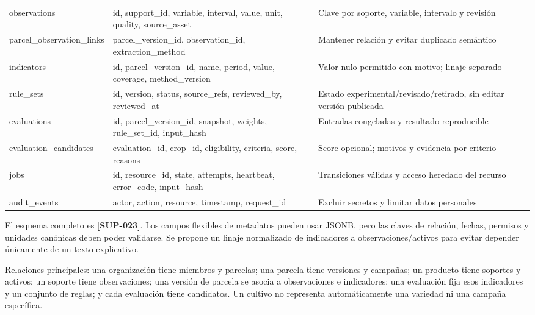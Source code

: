 \documentclass[10pt,a4paper]{article}
\begin{document}
\begin{longtable}{>{\raggedright\arraybackslash}p{3.647cm}>{\raggedright\arraybackslash}p{5.867cm}>{\raggedright\arraybackslash}p{6.343cm}}
observations & id, support\_\allowbreak{}id, variable, interval, value, unit, quality, source\_\allowbreak{}asset & Clave por soporte, variable, intervalo y revisión \\[3pt]
parcel\_\allowbreak{}observation\_\allowbreak{}links & parcel\_\allowbreak{}version\_\allowbreak{}id, observation\_\allowbreak{}id, extraction\_\allowbreak{}method & Mantener relación y evitar duplicado semántico \\[3pt]
indicators & id, parcel\_\allowbreak{}version\_\allowbreak{}id, name, period, value, coverage, method\_\allowbreak{}version & Valor nulo permitido con motivo; linaje separado \\[3pt]
rule\_\allowbreak{}sets & id, version, status, source\_\allowbreak{}refs, reviewed\_\allowbreak{}by, reviewed\_\allowbreak{}at & Estado experimental/\allowbreak{}revisado/\allowbreak{}retirado, sin editar versión publicada \\[3pt]
evaluations & id, parcel\_\allowbreak{}version\_\allowbreak{}id, snapshot, weights, rule\_\allowbreak{}set\_\allowbreak{}id, input\_\allowbreak{}hash & Entradas congeladas y resultado reproducible \\[3pt]
evaluation\_\allowbreak{}candidates & evaluation\_\allowbreak{}id, crop\_\allowbreak{}id, eligibility, criteria, score, reasons & Score opcional; motivos y evidencia por criterio \\[3pt]
jobs & id, resource\_\allowbreak{}id, state, attempts, heartbeat, error\_\allowbreak{}code, input\_\allowbreak{}hash & Transiciones válidas y acceso heredado del recurso \\[3pt]
audit\_\allowbreak{}events & actor, action, resource, timestamp, request\_\allowbreak{}id & Excluir secretos y limitar datos personales \\[3pt]
\end{longtable}
\endgroup

El esquema completo es \textbf{[SUP-023]}. Los campos flexibles de metadatos pueden usar JSONB, pero las claves de relación, fechas, permisos y unidades canónicas deben poder validarse. Se propone un linaje normalizado de indicadores a observaciones/\allowbreak{}activos para evitar depender únicamente de un texto explicativo.


Relaciones principales: una organización tiene miembros y parcelas; una parcela tiene versiones y campañas; un producto tiene soportes y activos; un soporte tiene observaciones; una versión de parcela se asocia a observaciones e indicadores; una evaluación fija esos indicadores y un conjunto de reglas; y cada evaluación tiene candidatos. Un cultivo no representa automáticamente una variedad ni una campaña específica.
\end{document}
